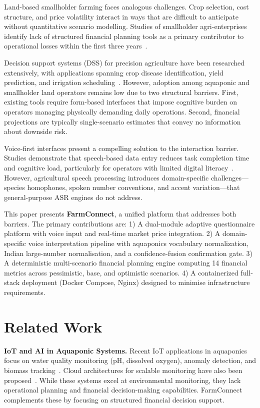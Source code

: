 \documentclass[conference]{IEEEtran}
\begin{document}
Land-based smallholder farming faces analogous challenges. Crop
selection, cost structure, and price volatility interact in ways that
are difficult to anticipate without quantitative scenario modelling.
Studies of smallholder agri-enterprises identify lack of structured
financial planning tools as a primary contributor to operational
losses within the first three years~\cite{ref4}.

Decision support systems (DSS) for precision agriculture have been
researched extensively, with applications spanning crop disease
identification, yield prediction, and irrigation
scheduling~\cite{ref2,ref15,ref16}. However, adoption among aquaponic and
smallholder land operators remains low due to two structural barriers.
First, existing tools require form-based interfaces that impose
cognitive burden on operators managing physically demanding daily
operations. Second, financial projections are typically single-scenario
estimates that convey no information about downside risk.

Voice-first interfaces present a compelling solution to the interaction
barrier. Studies demonstrate that speech-based data entry reduces task completion time and cognitive load, particularly for operators with limited digital literacy~\cite{ref3,ref20}. However, agricultural speech
processing introduces domain-specific challenges---species homophones, spoken number conventions, and accent variation---that general-purpose ASR engines do not address. 

This paper presents \textbf{FarmConnect}, a unified platform that
addresses both barriers. The primary contributions are:
1) A dual-module adaptive questionnaire platform with voice input and real-time market price integration.
2) A domain-specific voice interpretation pipeline with aquaponics vocabulary normalization, Indian large-number normalisation, and a confidence-fusion confirmation gate.
3) A deterministic multi-scenario financial planning engine computing 14 financial metrics across pessimistic, base, and optimistic scenarios.
4) A containerized full-stack deployment (Docker Compose, Nginx) designed to minimise infrastructure requirements.

\section{Related Work}
\label{sec:related}

\textbf{IoT and AI in Aquaponic Systems.} Recent IoT applications in aquaponics focus on water quality monitoring (pH, dissolved oxygen), anomaly detection, and biomass tracking~\cite{ref6,ref12,ref14,ref19}. Cloud architectures for scalable monitoring have also been proposed~\cite{ref13}. While these systems excel at environmental monitoring, they lack operational planning and financial decision-making capabilities. FarmConnect complements these by focusing on structured financial decision support.
\end{document}
